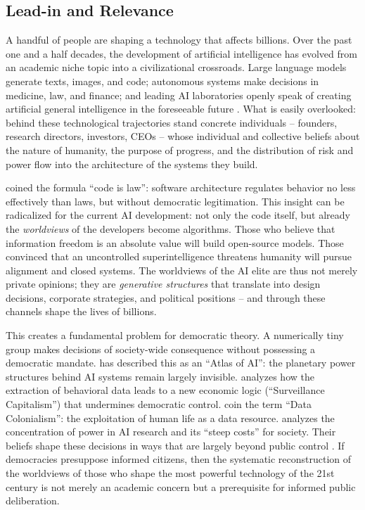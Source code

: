 \documentclass[12pt,a4paper]{article}
\begin{document}
\subsection{Lead-in and Relevance}
\label{sec:einleitung:relevanz}

A handful of people are shaping a technology that affects billions. Over the past one and a half decades, the development of artificial intelligence has evolved from an academic niche topic into a civilizational crossroads. Large language models generate texts, images, and code; autonomous systems make decisions in medicine, law, and finance; and leading AI laboratories openly speak of creating artificial general intelligence in the foreseeable future \citep{OpenAI2023Charter, AnthropicCoreViews2023, Bengio2024}. What is easily overlooked: behind these technological trajectories stand concrete individuals -- founders, research directors, investors, CEOs -- whose individual and collective beliefs about the nature of humanity, the purpose of progress, and the distribution of risk and power flow into the architecture of the systems they build.

\citet{Lessig1999} coined the formula ``code is law'': software architecture regulates behavior no less effectively than laws, but without democratic legitimation. This insight can be radicalized for the current AI development: not only the code itself, but already the \emph{worldviews} of the developers become algorithms. Those who believe that information freedom is an absolute value will build open-source models. Those convinced that an uncontrolled superintelligence threatens humanity will pursue alignment and closed systems. The worldviews of the AI elite are thus not merely private opinions; they are \emph{generative structures} that translate into design decisions, corporate strategies, and political positions -- and through these channels shape the lives of billions.

This creates a fundamental problem for democratic theory. A numerically tiny group makes decisions of society-wide consequence without possessing a democratic mandate. \citet{Crawford2021} has described this as an ``Atlas of AI'': the planetary power structures behind AI systems remain largely invisible. \citet{Zuboff2019} analyzes how the extraction of behavioral data leads to a new economic logic (``Surveillance Capitalism'') that undermines democratic control. \citet{Couldry2019} coin the term ``Data Colonialism'': the exploitation of human life as a data resource. \citet{Whittaker2021} analyzes the concentration of power in AI research and its ``steep costs'' for society. Their beliefs shape these decisions in ways that are largely beyond public control \citep{Floridi2019, Floridi2023}. If democracies presuppose informed citizens, then the systematic reconstruction of the worldviews of those who shape the most powerful technology of the 21st century is not merely an academic concern but a prerequisite for informed public deliberation.
\end{document}
